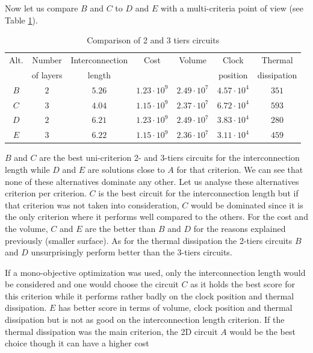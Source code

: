 Now let us compare $B$ and $C$ to $D$ and $E$ with a multi-criteria point of view (see Table \ref{tab:validbcde}).

\begin{table}[h!]
\caption{Comparison of 2 and 3 tiers circuits}
\begin{center}
\begin{footnotesize}
\begin{tabular}{|c|c|ccccc|}
\hline
Alt. & Number & Interconnection & Cost & Volume & Clock & Thermal\\
 & of layers & length & & & position & dissipation\\
\hline
$B$ & $2$ & $5.26$ & $1.23\cdot10^9$ & $2.49\cdot 10^7$ & $4.57\cdot 10^4$ & $351$ \\
$C$ & $3$ & $4.04$ & $1.15\cdot10^9$ & $2.37\cdot 10^7$ & $6.72\cdot 10^4$ & $593$ \\
$D$ & $2$ & $6.21$ & $1.23\cdot10^9$ & $2.49\cdot 10^7$ & $3.83\cdot 10^4$ & $280$ \\
$E$ & $3$ & $6.22$ & $1.15\cdot10^9$ & $2.36\cdot 10^7$ & $3.11\cdot 10^4$ & $459$ \\
\hline
\end{tabular}
\end{footnotesize}
\end{center}
\label{tab:validbcde}
\end{table}

$B$ and $C$ are the best uni-criterion 2- and 3-tiers circuits for the interconnection length while $D$ and $E$ are solutions close to $A$ for that criterion. We can see that none of these alternatives dominate any other. Let us analyse these alternatives criterion per criterion. $C$ is the best circuit for the interconnection length but if that criterion was not taken into consideration, $C$ would be dominated since it is the only criterion where it performs well compared to the others. For the cost and the volume, $C$ and $E$ are the better than $B$ and $D$ for the reasons explained previously (smaller surface). As for the thermal dissipation the 2-tiers circuits $B$ and $D$ unsurprisingly perform better than the 3-tiers circuits. 

If a mono-objective optimization was used, only the interconnection length would be considered and one would choose the circuit $C$ as it holds the best score for this criterion while it performs rather badly on the clock position and thermal dissipation. $E$ has better score in terms of volume, clock position and thermal dissipation but is not as good on the interconnection length criterion. If the thermal dissipation was the main criterion, the 2D circuit $A$ would be the best choice though it can have a higher cost

